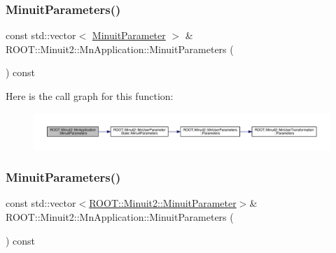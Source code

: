 \subsubsection{\texorpdfstring{MinuitParameters()}{MinuitParameters()}\hspace{0.1cm}{\footnotesize\ttfamily [1/3]}}
{\footnotesize\ttfamily const std\+::vector$<$ \mbox{\hyperlink{classROOT_1_1Minuit2_1_1MinuitParameter}{Minuit\+Parameter}} $>$ \& R\+O\+O\+T\+::\+Minuit2\+::\+Mn\+Application\+::\+Minuit\+Parameters (\begin{DoxyParamCaption}{ }\end{DoxyParamCaption}) const}

Here is the call graph for this function\+:
\nopagebreak
\begin{figure}[H]
\begin{center}
\leavevmode
\includegraphics[width=350pt]{df/dd5/classROOT_1_1Minuit2_1_1MnApplication_a415948149d0f79b43adccc1cb7040e10_cgraph}
\end{center}
\end{figure}
\mbox{\label{classROOT_1_1Minuit2_1_1MnApplication_a8ae2de0bd82d99a3ac28da32bcbe98ea}} 
\subsubsection{\texorpdfstring{MinuitParameters()}{MinuitParameters()}\hspace{0.1cm}{\footnotesize\ttfamily [2/3]}}
{\footnotesize\ttfamily const std\+::vector$<$\mbox{\hyperlink{classROOT_1_1Minuit2_1_1MinuitParameter}{R\+O\+O\+T\+::\+Minuit2\+::\+Minuit\+Parameter}}$>$\& R\+O\+O\+T\+::\+Minuit2\+::\+Mn\+Application\+::\+Minuit\+Parameters (\begin{DoxyParamCaption}{ }\end{DoxyParamCaption}) const}

\mbox{\label{classROOT_1_1Minuit2_1_1MnApplication_a8ae2de0bd82d99a3ac28da32bcbe98ea}} 
